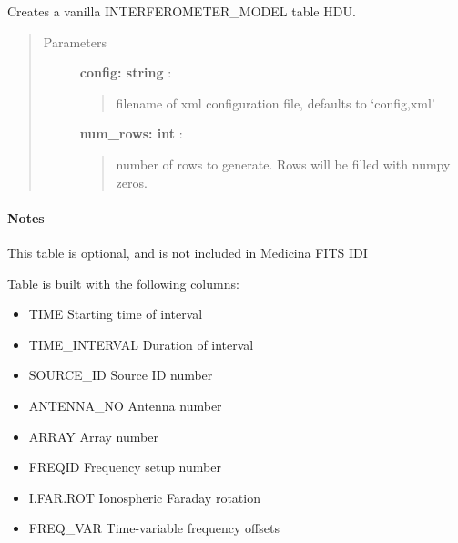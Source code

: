 \documentclass[letterpaper,10pt,english]{sphinxmanual}
\begin{document}

\begin{fulllineitems}
\label{index:pyFitsidi.make_interferometer_model}
Creates a vanilla INTERFEROMETER\_MODEL table HDU.
\begin{quote}\begin{description}
\item[{Parameters }] \leavevmode
\textbf{config: string} :
\begin{quote}

filename of xml configuration file, defaults to `config,xml'
\end{quote}

\textbf{num\_rows: int} :
\begin{quote}

number of rows to generate. Rows will be filled with numpy zeros.
\end{quote}

\end{description}\end{quote}
\paragraph{Notes}

This table is optional, and is not included in Medicina FITS IDI

Table is built with the following columns:
\begin{itemize}
\item {} 
TIME          Starting time of interval

\item {} 
TIME\_INTERVAL Duration of interval

\item {} 
SOURCE\_ID     Source ID number

\item {} 
ANTENNA\_NO    Antenna number

\item {} 
ARRAY         Array number

\item {} 
FREQID        Frequency setup number

\item {} 
I.FAR.ROT     Ionospheric Faraday rotation

\item {} 
FREQ\_VAR      Time-variable frequency offsets


\end{itemize}
\end{fulllineitems}
\end{document}
